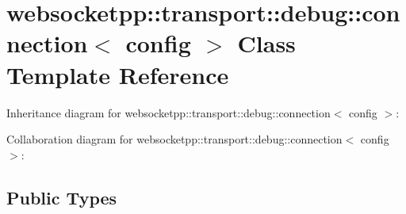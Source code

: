 \hypertarget{classwebsocketpp_1_1transport_1_1debug_1_1connection}{}\section{websocketpp\+:\+:transport\+:\+:debug\+:\+:connection$<$ config $>$ Class Template Reference}
\label{classwebsocketpp_1_1transport_1_1debug_1_1connection}


Inheritance diagram for websocketpp\+:\+:transport\+:\+:debug\+:\+:connection$<$ config $>$\+:


Collaboration diagram for websocketpp\+:\+:transport\+:\+:debug\+:\+:connection$<$ config $>$\+:
\subsection*{Public Types}
